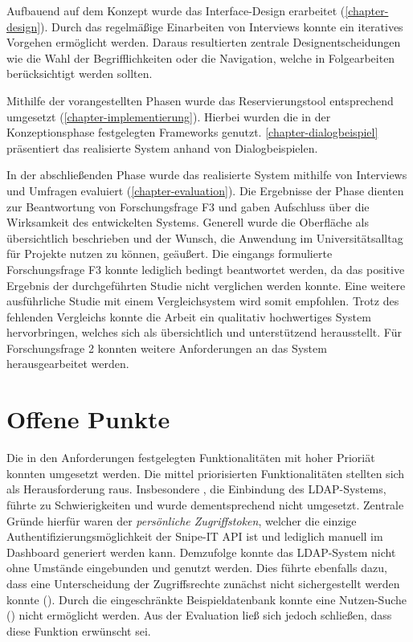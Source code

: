Aufbauend auf dem Konzept wurde das Interface-Design erarbeitet
(\ref{chapter-design}). Durch das regelmäßige Einarbeiten von Interviews konnte
ein iteratives Vorgehen ermöglicht werden. Daraus resultierten zentrale
Designentscheidungen wie die Wahl der Begrifflichkeiten oder die Navigation, welche in
Folgearbeiten berücksichtigt werden sollten.

Mithilfe der vorangestellten Phasen wurde das Reservierungstool entsprechend
umgesetzt (\ref{chapter-implementierung}). Hierbei wurden die in der
Konzeptionsphase festgelegten Frameworks genutzt. \ref{chapter-dialogbeispiel}
präsentiert das realisierte System anhand von Dialogbeispielen.

In der abschließenden Phase wurde das realisierte System mithilfe von Interviews
und Umfragen evaluiert (\ref{chapter-evaluation}). Die Ergebnisse der Phase
dienten zur Beantwortung von Forschungsfrage F3 und gaben Aufschluss über die
Wirksamkeit des entwickelten Systems. Generell wurde die Oberfläche als
übersichtlich beschrieben und der Wunsch, die Anwendung im Universitätsalltag
für Projekte nutzen zu können, geäußert. Die eingangs formulierte Forschungsfrage
F3 konnte lediglich bedingt beantwortet werden, da das positive Ergebnis der
durchgeführten Studie nicht verglichen werden konnte. Eine weitere ausführliche
Studie mit einem Vergleichsystem wird somit empfohlen. Trotz des fehlenden
Vergleichs konnte die Arbeit ein qualitativ hochwertiges System hervorbringen,
welches sich als übersichtlich und unterstützend herausstellt. Für
Forschungsfrage 2 konnten weitere Anforderungen an das System herausgearbeitet
werden.

\section{Offene Punkte}
\label{sec:punkte}
Die in den Anforderungen festgelegten Funktionalitäten mit hoher Prioriät
konnten umgesetzt werden. Die mittel priorisierten Funktionalitäten stellten
sich als Herausforderung raus. Insbesondere , die Einbindung des
LDAP-Systems, führte zu Schwierigkeiten und wurde dementsprechend nicht
umgesetzt. Zentrale Gründe hierfür waren der \textit{persönliche
    Zugriffstoken}, welcher die einzige Authentifizierungsmöglichkeit der Snipe-IT
API ist und lediglich manuell im Dashboard generiert werden kann. Demzufolge
konnte das LDAP-System nicht ohne Umstände eingebunden und genutzt
werden. Dies führte ebenfalls dazu, dass eine Unterscheidung der Zugriffsrechte
zunächst nicht sichergestellt werden konnte (). Durch die
eingeschränkte Beispieldatenbank konnte eine Nutzen-Suche () nicht
ermöglicht werden. Aus der Evaluation ließ sich jedoch schließen, dass diese
Funktion erwünscht sei.

